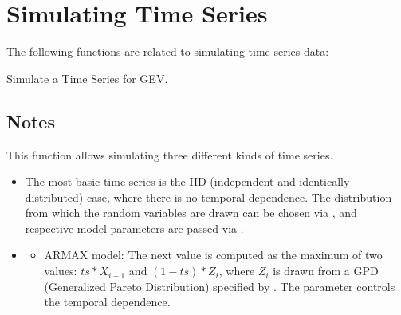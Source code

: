 \documentclass[a4paper,11pt,openany,english]{sphinxmanual}
\begin{document}
\section{Simulating Time Series}
\label{\detokenize{api_misc:simulating-time-series}}
\sphinxAtStartPar
The following functions are related to simulating time series data:

\begin{fulllineitems}
\label{\detokenize{api_misc:xtremes.miscellaneous.simulate_timeseries}}
\pysigstartsignatures
{}
\pysigstopsignatures
\sphinxAtStartPar
Simulate a Time Series for GEV.


\subsection{Notes}
\label{\detokenize{api_misc:id32}}
\sphinxAtStartPar
This function allows simulating three different kinds of time series.
\begin{itemize}
\item {} 
\sphinxAtStartPar
The most basic time series is the IID (independent and identically distributed) case, 
where there is no temporal dependence. The distribution from which the random variables 
are drawn can be chosen via , and respective model parameters are passed via 
.

\item {} \begin{description}
\begin{itemize}
\item {} 
\sphinxAtStartPar
ARMAX model: The next value is computed as the maximum of two values: 
\(ts * X_{i-1}\) and \((1 - ts) * Z_i\), where \(Z_i\) is drawn from a GPD (Generalized 
Pareto Distribution) specified by . The parameter  controls the 
temporal dependence.


\end{itemize}
\end{description}
\end{itemize}
\end{fulllineitems}
\end{document}
